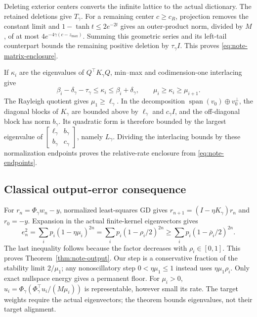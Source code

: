 Deleting exterior centers converts the infinite lattice to the actual
dictionary. The retained deletions give $T_\gamma$. For a remaining center
$c\ge c_R$, projection removes the constant limit and
$1-\tanh t\le2e^{-2t}$ gives an outer-product norm, divided by $M$, of at
most $4e^{-4\gamma(c-z_{\max})}$.
Summing this geometric series and its left-tail counterpart bounds the
remaining positive deletion by $\tau_\gamma I$. This proves
\eqref{eq:note-matrix-enclosure}.

If $\kappa_i$ are the eigenvalues of $Q^\top K_\gamma Q$, min--max and
codimension-one interlacing give
\begin{equation}
 \beta_i-\delta_\gamma-\tau_\gamma\le\kappa_i
 \le\beta_i+\delta_\gamma,
 \qquad \mu_i\ge\kappa_i\ge\mu_{i+1}.
\end{equation}
The Rayleigh quotient gives $\mu_1\ge\ell_\gamma$.
In the decomposition $\operatorname{span}(v_0)\oplus v_0^\perp$,
the diagonal blocks of $K_\gamma$ are bounded above by
$\ell_\gamma$ and $c_\gamma I$, and the off-diagonal block has norm
$b_\gamma$. Its quadratic form is therefore bounded by the largest
eigenvalue of $\left[\begin{smallmatrix}\ell_\gamma&b_\gamma\\
b_\gamma&c_\gamma\end{smallmatrix}\right]$, namely $L_\gamma$.
Dividing the interlacing bounds by these normalization endpoints proves
the relative-rate enclosure from \eqref{eq:note-endpoints}.

\subsection{Classical output-error consequence}
For $r_n=\Phi_\gamma w_n-y$, normalized least-squares GD gives
$r_{n+1}=(I-\eta K_\gamma)r_n$ and $r_0=-y$. Expansion in the actual
finite-kernel eigenvectors gives
\begin{equation}
 e_n^2=\sum_i p_i(1-\eta\mu_i)^{2n}
 =\sum_i p_i(1-\rho_i/2)^{2n}
 \ge\sum_i p_i(1-\overline\rho_i/2)^{2n}.
\end{equation}
The last inequality follows because the factor decreases with
$\rho_i\in[0,1]$. This proves Theorem~\ref{thm:note-output}.
Our step is a conservative fraction of the stability limit $2/\mu_1$;
any nonoscillatory step $0<\eta\mu_1\le1$ instead uses $\eta\mu_1\rho_i$.
Only exact nullspace energy gives a permanent floor. For $\mu_i>0$,
$u_i=\Phi_\gamma(\Phi_\gamma^\top u_i/(M\mu_i))$ is representable,
however small its rate. The target weights require the actual eigenvectors;
the theorem bounds eigenvalues, not their target alignment.

